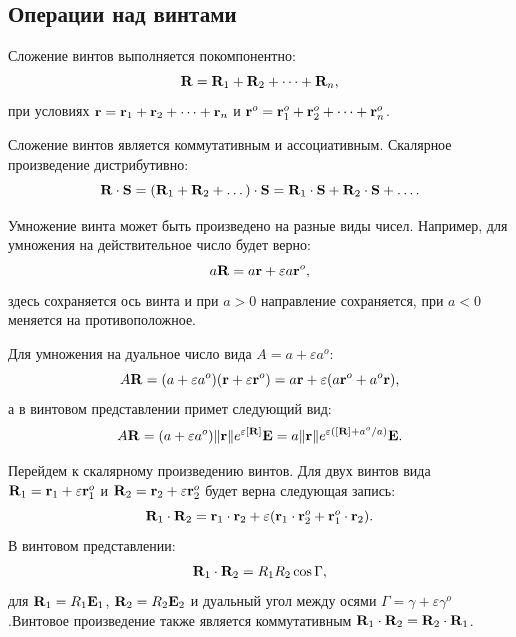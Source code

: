 \subsection{Операции над винтами}

Сложение винтов выполняется покомпонентно:
\begin{equation*}
    \vb{R} = \vb{R}_1 + \vb{R}_2 + \dots + \vb{R}_n,
\end{equation*}
при условиях $\vb{r} = \vb{r}_1 + \vb{r}_2 + \dots + \vb{r}_n$ и $\vb{r}^o = \vb{r}_1^o + \vb{r}_2^o + \dots + \vb{r}_n^o$.

Сложение винтов является коммутативным и ассоциативным. Скалярное произведение дистрибутивно:
\begin{equation*}
    \vb{R} \cdot \vb{S} = (\vb{R}_1 + \vb{R}_2 + \dots) \cdot \vb{S} = \vb{R}_1 \cdot \vb{S} + \vb{R}_2 \cdot \vb{S} + \dots.
\end{equation*}

Умножение винта может быть произведено на разные виды чисел. Например, для умножения на действительное число будет верно:
\begin{equation*}
    a \vb{R} = a \vb{r} + \varepsilon a \vb{r}^o,
\end{equation*}
здесь сохраняется ось винта и при $a > 0$ направление сохраняется, при $a < 0$ меняется на противоположное.

Для умножения на дуальное число вида $A = a + \varepsilon a^o$:
\begin{equation*}
    A \vb{R} = (a + \varepsilon a^o)(\vb{r} + \varepsilon \vb{r}^o) = a \vb{r} + \varepsilon (a \vb{r}^o + a^o \vb{r}),
\end{equation*}
а в винтовом представлении примет следующий вид:
\begin{equation*}
    A \vb{R} = (a + \varepsilon a^o) \|\vb{r}\| e^{\varepsilon [\vb{R}]} \vb{E} = a \|\vb{r}\| e^{\varepsilon ([\vb{R}] + a^o / a)} \vb{E}.
\end{equation*}

Перейдем к скалярному произведению винтов. Для двух винтов вида $\vb{R}_1 = \vb{r}_1 + \varepsilon \vb{r}_1^o$ и $\vb{R}_2 = \vb{r}_2 + \varepsilon \vb{r}_2^o$ будет верна следующая запись:
\begin{equation*}
    \vb{R}_1 \cdot \vb{R}_2 = \vb{r}_1 \cdot \vb{r}_2 + \varepsilon (\vb{r}_1 \cdot \vb{r}_2^o + \vb{r}_1^o \cdot \vb{r}_2).
\end{equation*}
В винтовом представлении:
\begin{equation*}
    \vb{R}_1 \cdot \vb{R}_2 = R_1 R_2 \cos \Gamma,
\end{equation*}
для $\vb{R}_1 = R_1 \vb{E}_1$, $\vb{R}_2 = R_2 \vb{E}_2$ и дуальный угол между осями $\Gamma = \gamma + \varepsilon \gamma^o$.Винтовое произведение также является коммутативным $\vb{R}_1 \cdot \vb{R}_2 = \vb{R}_2 \cdot \vb{R}_1$.

